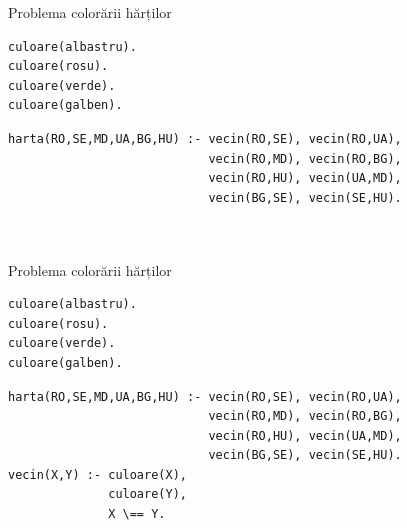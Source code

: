 \documentclass[xcolor=x11names,compress,10pt]{beamer}
\begin{document}




\addtocounter{framenumber}{-1}

\begin{frame}[fragile]{Problema colorării hărților}


\begin{example}
\vspace{-.3cm}
\begin{verbatim}
culoare(albastru).
culoare(rosu).
culoare(verde).
culoare(galben).
\end{verbatim}

\begin{verbatim}
harta(RO,SE,MD,UA,BG,HU) :- vecin(RO,SE), vecin(RO,UA), 
                            vecin(RO,MD), vecin(RO,BG),                      	                         
                            vecin(RO,HU), vecin(UA,MD),
                            vecin(BG,SE), vecin(SE,HU).

                             
\end{verbatim}

\vspace{.4cm}
\end{example}
\end{frame}

\addtocounter{framenumber}{-1}
\begin{frame}[fragile]{Problema colorării hărților}

\vspace{.4cm}


\begin{example}

\vspace{-.3cm}
\begin{verbatim}
culoare(albastru).
culoare(rosu).
culoare(verde).
culoare(galben).
\end{verbatim}

\begin{verbatim}
harta(RO,SE,MD,UA,BG,HU) :- vecin(RO,SE), vecin(RO,UA), 
                            vecin(RO,MD), vecin(RO,BG),                      	                          
                            vecin(RO,HU), vecin(UA,MD),
                            vecin(BG,SE), vecin(SE,HU).
vecin(X,Y) :- culoare(X), 
              culoare(Y), 
              X \== Y.                      
\end{verbatim}
\end{example}
\end{frame}
\end{document}

